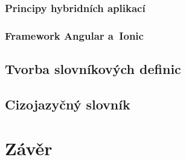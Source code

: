 \hypertarget{principy-hybridnuxedch-aplikacuxed}{%
\subsection{Principy hybridních
aplikací}\label{principy-hybridnuxedch-aplikacuxed}}

\hypertarget{framework-angular-a-ionic}{%
\subsection{Framework Angular
a~Ionic}\label{framework-angular-a-ionic}}

\hypertarget{tvorba-slovnuxedkovuxfdch-definic}{%
\section{Tvorba slovníkových
definic}\label{tvorba-slovnuxedkovuxfdch-definic}}

\hypertarget{cizojazyux10dnuxfd-slovnuxedk}{%
\section{Cizojazyčný slovník}\label{cizojazyux10dnuxfd-slovnuxedk}}

\hypertarget{zuxe1vux11br}{%
\chapter*{Závěr}\label{zaver}
}
